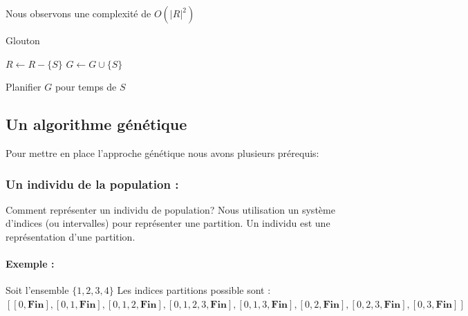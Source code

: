 \documentclass[runningheads]{llncs}
\begin{document}
Nous observons une complexité  de $O(|R|^2)$
\begin{algorithm}[H]
    \caption{Glouton}%
    \label{alg:greedy}
    \begin{algorithmic}[1]
        \State $ R \gets R - \{S\}$
        \State $ G \gets G \cup \{S\}$
      
          \EndIf{}
       \EndFor{}
       Planifier $G$ pour temps de $S$
      \EndWhile{}
    \end{algorithmic}
  \end{algorithm}

\subsection{Un algorithme g\'en\'etique}
Pour mettre en place l'approche génétique nous avons plusieurs prérequis:
\subsubsection{Un individu de la population :} Comment représenter un individu de population?
Nous utilisation un système d'indices (ou intervalles) pour représenter une partition. 
Un individu est une représentation d'une partition.

\paragraph{Exemple : } Soit l'ensemble $\{1, 2, 3, 4\}$ 
Les indices partitions possible sont :
$[[0, \textbf{Fin}], [0,1, \textbf{Fin}], [0,1, 2, \textbf{Fin}], [0,1, 2, 3, \textbf{Fin}], [0,1, 3, \textbf{Fin}], [0,2, \textbf{Fin}], [0,2, 3, \textbf{Fin}], [0,3, \textbf{Fin}]]$
\end{document}
